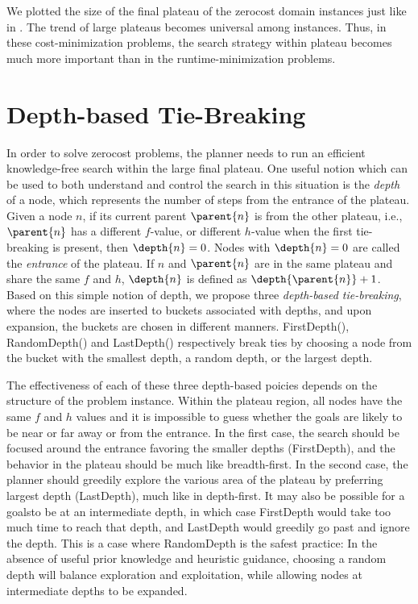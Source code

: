 We plotted the size of the final plateau of the zerocost domain instances just like in
. The trend of large plateaus becomes universal among
instances. Thus, in these cost-minimization problems, the search strategy within
plateau becomes much more important than in the
runtime-minimization problems.

\section{Depth-based Tie-Breaking}

In order to solve zerocost problems, the planner needs to run an
efficient knowledge-free search within the large final plateau.
One useful notion which can be used to both understand and control the
search in this situation is the \emph{depth} of a node, which represents
the number of steps from the entrance of the plateau.  Given a node $n$,
if its current parent $\parent{n}$ is from the other plateau, i.e.,
$\parent{n}$ has a different $f$-value, or different $h$-value when the
first tie-breaking is present, then $\depth{n} = 0$. Nodes with
$\depth{n} = 0$ are called the \emph{entrance} of the plateau.  If $n$
and $\parent{n}$ are in the same plateau and share the same $f$ and $h$,
$\depth{n}$ is defined as $\depth{\parent{n}} + 1$.  Based on this
simple notion of depth, we propose three \emph{depth-based
tie-breaking}, where the nodes are inserted to buckets associated with
depths, and upon expansion, the buckets are chosen in different manners.
FirstDepth(\fd), RandomDepth(\rd) and LastDepth(\ld) respectively break
ties by choosing a node from the bucket with the smallest depth, a
random depth, or the largest depth.

The effectiveness of each of these three depth-based poicies depends on the
structure of the problem instance.  Within
the plateau region, all nodes have the same $f$ and $h$ values
and it is impossible to guess whether the goals are likely to be  near or far
away or from the entrance.  In the first case, the
search should be focused around the entrance favoring the smaller depths
(FirstDepth), and the behavior in the plateau should be much like breadth-first. In the
second case, the planner should greedily explore the various area of the
plateau by preferring largest depth (LastDepth), much like in
depth-first. 
It may also be possible for a goalsto be at an intermediate depth, in which case
FirstDepth would take too much time to reach that
depth, and LastDepth would greedily go past and ignore the depth.
This is a case
where RandomDepth is the safest practice: 
In the absence of useful prior knowledge and heuristic guidance,
choosing a random depth will balance exploration and exploitation,
while allowing nodes at intermediate depths to be expanded.


